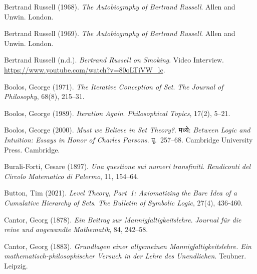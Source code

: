 \par\medskip{}\label{bib:Russell1968}
Bertrand Russell (1968). \emph{The Autobiography of Bertrand Russell}. Allen and Unwin. London.

\par\medskip{}\label{bib:Russell1969}
Bertrand Russell (1969). \emph{The Autobiography of Bertrand Russell}. Allen and Unwin. London.

\par\medskip{}\label{bib:RussellND}
Bertrand Russell (n.d.). \emph{{B}ertrand {R}ussell on Smoking}. Video Interview. \url{https://www.youtube.com/watch?v=80oLTiVW_lc}.

\par\medskip{}\label{bib:Boolos1971}
Boolos, George (1971). \emph{The Iterative Conception of Set}. \emph{The Journal of Philosophy}, 68(8), 215--31.

\par\medskip{}\label{bib:Boolos1989}
Boolos, George (1989). \emph{Iteration Again}. \emph{Philosophical Topics}, 17(2), 5--21.

\par\medskip{}\label{bib:Boolos2000}
Boolos, George (2000). \emph{Must we Believe in Set Theory?}. मध्ये: \emph{Between Logic and Intuition: Essays in Honor of {Charles} {Parsons}}. पृ.~257--68. Cambridge University Press. Cambridge.

\par\medskip{}\label{bib:Burali-Forti1897}
Burali-Forti, Cesare (1897). \emph{Una questione sui numeri transfiniti}. \emph{Rendiconti del Circolo Matematico di Palermo}, 11, 154--64.

\par\medskip{}\label{bib:ButtonLT1}
Button, Tim (2021). \emph{Level Theory, Part~1: Axiomatizing the Bare Idea of a Cumulative Hierarchy of Sets}. \emph{The Bulletin of Symbolic Logic}, 27(4), 436-460.

\par\medskip{}\label{bib:Cantor1878}
Cantor, Georg (1878). \emph{Ein {Beitrag} zur {Mannigfaltigkeitslehre}}. \emph{Journal für die reine und angewandte Mathematik}, 84, 242--58.

\par\medskip{}\label{bib:Cantor1883}
Cantor, Georg (1883). \emph{Grundlagen einer allgemeinen {Mannigfaltigkeitslehre}. Ein mathematisch-philosophischer {Versuch} in der {Lehre} des {Unendlichen}}. Teubner. Leipzig.

